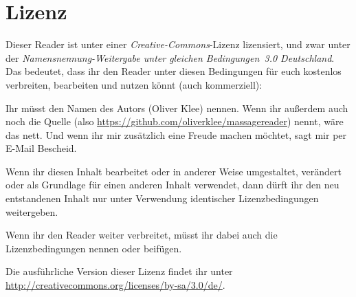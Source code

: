 \chapter{Lizenz}

Dieser Reader ist unter einer \emph{Creative-Commons}-Lizenz lizensiert, und zwar unter der \emph{Namensnennung-Weitergabe unter gleichen Bedingungen~3.0 Deutschland}. Das bedeutet, dass ihr den Reader unter diesen Bedingungen für euch kostenlos verbreiten, bearbeiten und nutzen könnt (auch kommerziell):
\begin{description}
  \item[Namensnennung.] Ihr müsst den Namen des Autors (Oliver Klee) nennen. Wenn ihr außerdem auch noch die Quelle (also \url{https://github.com/oliverklee/massagereader}) nennt, wäre das nett. Und wenn ihr mir zusätzlich eine Freude machen möchtet, sagt mir per E-Mail Bescheid.
  \item[Weitergabe unter gleichen Bedingungen.] Wenn ihr diesen Inhalt bearbeitet oder in anderer Weise umgestaltet, verändert oder als Grundlage für einen anderen Inhalt verwendet, dann dürft ihr den neu entstandenen Inhalt nur unter Verwendung identischer Lizenzbedingungen weitergeben.
  \item Wenn ihr den Reader weiter verbreitet, müsst ihr dabei auch die Lizenzbedingungen nennen oder beifügen.
\end{description} 

Die ausführliche Version dieser Lizenz findet ihr unter \url{http://creativecommons.org/licenses/by-sa/3.0/de/}.
